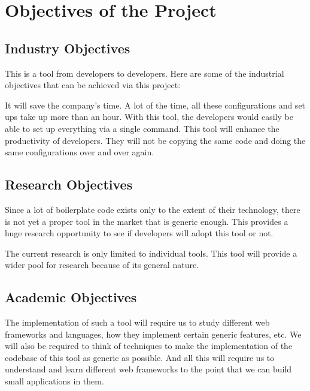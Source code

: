\section{Objectives of the Project}

\subsection{Industry Objectives}
This is a tool from developers to developers. Here are some of the industrial objectives that can be achieved via this project:

It will save the company's time. A lot of the time, all these configurations and set ups take up more than an hour. With this tool, the developers would easily be able to set up everything via a single command.
This tool will enhance the productivity of developers. They will not be copying the same code and doing the same configurations over and over again.

\subsection{Research Objectives}
Since a lot of boilerplate code exists only to the extent of their technology, there is not yet a proper tool in the market that is generic enough. This provides a huge research opportunity to see if developers will adopt this tool or not.

The current research is only limited to individual tools. This tool will provide a wider pool for research because of its general nature.

\subsection{Academic Objectives}
The implementation of such a tool will require us to study different web frameworks and languages, how they implement certain generic features, etc. We will also be required to think of techniques to make the implementation of the codebase of this tool as generic as possible. And all this will require us to understand and learn different web frameworks to the point that we can build small applications in them.
